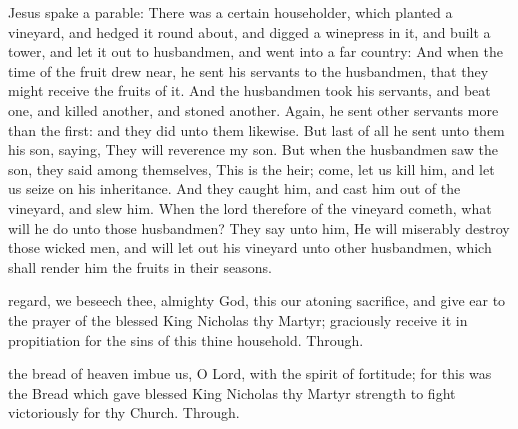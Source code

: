 Jesus spake a parable: There was a certain householder, which planted a vineyard, and hedged it round about, and digged a winepress in it, and built a tower, and let it out to husbandmen, and went into a far country: And when the time of the fruit drew near, he sent his servants to the husbandmen, that they might receive the fruits of it. And the husbandmen took his servants, and beat one, and killed another, and stoned another. Again, he sent other servants more than the first: and they did unto them likewise. But last of all he sent unto them his son, saying, They will reverence my son. But when the husbandmen saw the son, they said among themselves, This is the heir; come, let us kill him, and let us seize on his inheritance. And they caught him, and cast him out of the vineyard, and slew him. When the lord therefore of the vineyard cometh, what will he do unto those husbandmen? They say unto him, He will miserably destroy those wicked men, and will let out his vineyard unto other husbandmen, which shall render him the fruits in their seasons.


\secret
{} regard, we beseech thee, almighty God, this our atoning sacrifice, and give ear to the prayer of the blessed King Nicholas thy Martyr; graciously receive it in propitiation for the sins of this thine household. Through.


\postcommunion
{} the bread of heaven imbue us, O Lord, with the spirit of fortitude; for this was the Bread which gave blessed King Nicholas thy Martyr strength to fight victoriously for thy Church. Through.